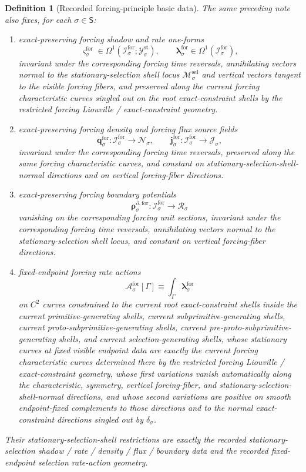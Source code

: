\documentclass[11pt]{article}
\newcommand{\SectorSet}{\mathsf S}
\newcommand{\StatTagClass}[1]{\mathcal Y_{#1}^{\mathrm{st}}}
\newcommand{\DensityClass}[1]{\mathscr N_{#1}}
\newcommand{\FluxClass}[1]{\mathscr J_{#1}}
\newcommand{\PhaseReadClass}[1]{\mathscr R_{#1}}
\newcommand{\ConstraintGap}[1]{\delta_{#1}}
\newcommand{\SelSpace}[1]{\mathcal M_{#1}^{\mathrm{sel}}}
\newcommand{\ForSpace}[1]{\mathcal I_{#1}^{\mathrm{for}}}
\newcommand{\ForShadowForm}[1]{\boldsymbol{\varsigma}_{#1}^{\mathrm{for}}}
\newcommand{\ForRateForm}[1]{\boldsymbol{\lambda}_{#1}^{\mathrm{for}}}
\newcommand{\ForDensitySource}[1]{\boldsymbol{q}_{#1}^{\mathrm{for}}}
\newcommand{\ForFluxSource}[1]{\boldsymbol{j}_{#1}^{\mathrm{for}}}
\newcommand{\ForBoundarySource}[1]{\boldsymbol{\rho}_{#1}^{\partial,\mathrm{for}}}
\newcommand{\ForAction}[1]{\mathscr A_{#1}^{\mathrm{for}}}
\newtheorem{definition}{Definition}
\begin{document}
\begin{definition}[Recorded forcing-principle basic data]
\label{def:recorded_forcing_basic}
The same preceding note also fixes, for each \(\sigma\in\SectorSet\):
\begin{enumerate}
    \item exact-preserving forcing shadow and rate one-forms
    \[
    \ForShadowForm{\sigma}\in\Omega^1(\ForSpace{\sigma};\StatTagClass{\sigma}),
    \qquad
    \ForRateForm{\sigma}\in\Omega^1(\ForSpace{\sigma}),
    \]
    invariant under the corresponding forcing time reversals, annihilating vectors normal to the stationary-selection shell locus \(\SelSpace{\sigma}\) and vertical vectors tangent to the visible forcing fibers, and preserved along the current forcing characteristic curves singled out on the root exact-constraint shells by the restricted forcing Liouville / exact-constraint geometry.
    \item exact-preserving forcing density and forcing flux source fields
    \[
    \ForDensitySource{\sigma}:\ForSpace{\sigma}\to\DensityClass{\sigma},
    \qquad
    \ForFluxSource{\sigma}:\ForSpace{\sigma}\to\FluxClass{\sigma},
    \]
    invariant under the corresponding forcing time reversals, preserved along the same forcing characteristic curves, and constant on stationary-selection-shell-normal directions and on vertical forcing-fiber directions.
    \item exact-preserving forcing boundary potentials
    \[
    \ForBoundarySource{\sigma}:\ForSpace{\sigma}\to\PhaseReadClass{\sigma}
    \]
    vanishing on the corresponding forcing unit sections, invariant under the corresponding forcing time reversals, annihilating vectors normal to the stationary-selection shell locus, and constant on vertical forcing-fiber directions.
    \item fixed-endpoint forcing rate actions
    \begin{equation}
    \ForAction{\sigma}[\Gamma]\equiv \int_\Gamma \ForRateForm{\sigma}
    \label{eq:recorded_forcing_action}
    \end{equation}
    on \(C^2\) curves constrained to the current root exact-constraint shells inside the current primitive-generating shells, current subprimitive-generating shells, current proto-subprimitive-generating shells, current pre-proto-subprimitive-generating shells, and current selection-generating shells, whose stationary curves at fixed visible endpoint data are exactly the current forcing characteristic curves determined there by the restricted forcing Liouville / exact-constraint geometry, whose first variations vanish automatically along the characteristic, symmetry, vertical forcing-fiber, and stationary-selection-shell-normal directions, and whose second variations are positive on smooth endpoint-fixed complements to those directions and to the normal exact-constraint directions singled out by \(\ConstraintGap{\sigma}\).
\end{enumerate}
Their stationary-selection-shell restrictions are exactly the recorded stationary-selection shadow / rate / density / flux / boundary data and the recorded fixed-endpoint selection rate-action geometry.
\end{definition}
\end{document}
